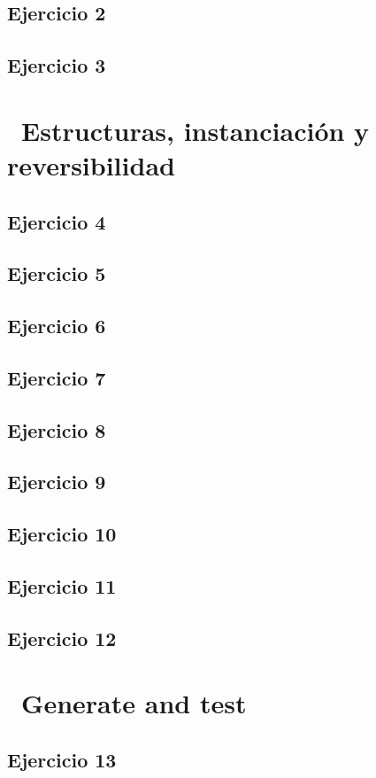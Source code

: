 \documentclass[10pt,a4paper]{article}
\begin{document}
\subsection{Ejercicio 2}
\subsection{Ejercicio 3}
\section*{\ Estructuras, instanciación y reversibilidad}
\subsection{Ejercicio 4}
\subsection{Ejercicio 5}
\subsection{Ejercicio 6}
\subsection{Ejercicio 7}
\subsection{Ejercicio 8}
\subsection{Ejercicio 9}
\subsection{Ejercicio 10}
\subsection{Ejercicio 11}
\subsection{Ejercicio 12}
\section*{\ Generate and test}
\subsection{Ejercicio 13}
\end{document}
